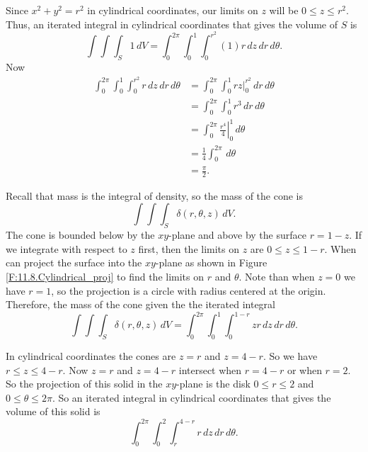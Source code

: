 \begin{smallhint}

\end{smallhint}
\begin{bighint}

\end{bighint}
\begin{activitySolution}

\ba
\item Since $x^2+y^2=r^2$ in cylindrical coordinates, our limits on $z$ will be $0 \leq z \leq r^2$. Thus, an iterated integral in cylindrical coordinates that gives the volume of $S$ is  
\[\int \int \int_S 1 \, dV = \int_{0}^{2\pi} \int_0^1 \int_0^{r^2} (1) r \, dz \, dr \, d\theta.\]
Now
\begin{align*}
\int_{0}^{2\pi} \int_0^1 \int_0^{r^2} r \, dz \, dr \, d\theta &= \int_{0}^{2\pi} \int_0^1 \left. rz \right|_0^{r^2} \, dr \, d\theta \\
	&= \int_{0}^{2\pi} \int_0^1 r^3 \, dr \, d\theta \\
	&= \int_{0}^{2\pi} \left. \frac{r^4}{4} \right|_0^1 \, d\theta \\
	&= \frac{1}{4} \int_{0}^{2\pi} \, d\theta \\
	&= \frac{\pi}{2}.
\end{align*}

\item Recall that mass is the integral of density, so the mass of the cone is
\[\int \int \int_S \delta(r, \theta, z) \, dV.\]
The cone is bounded below by the $xy$-plane and above by the surface $r=1-z$. If we integrate with respect to $z$ first, then the limits on $z$ are $0 \leq z \leq 1-r$. When can project the surface into the $xy$-plane as shown in Figure \ref{F:11.8.Cylindrical_proj} to find the limits on $r$ and $\theta$. Note than when $z=0$ we have $r=1$, so the projection is a circle with radius centered at the origin. Therefore, the mass of the cone given the the iterated integral
\[\int \int \int_S \delta(r, \theta, z) \, dV = \int_0^{2\pi} \int_0^1 \int_0^{1-r} zr \, dz \, dr \, d\theta.\]

\item In cylindrical coordinates the cones are $z=r$ and $z=4-r$. So we have $r \leq z \leq 4-r$. Now $z=r$ and $z=4-r$ intersect when $r = 4-r$ or when $r=2$. So the projection of this solid in the $xy$-plane is the disk $0 \leq r \leq 2$ and $0 \leq \theta \leq 2\pi$. So an iterated integral in cylindrical coordinates that gives the volume of this solid is
\[\int_0^{2\pi} \int_0^2 \int_{r}^{4-r} r \, dz \, dr \, d\theta.\]

\ea

\end{activitySolution}
\aftera
